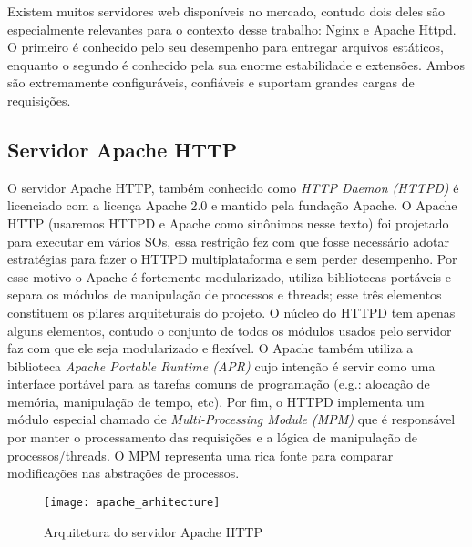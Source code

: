 Existem muitos servidores web disponíveis no mercado, contudo dois deles são
especialmente relevantes para o contexto desse trabalho: Nginx e Apache Httpd.
O primeiro é conhecido pelo seu desempenho para entregar arquivos estáticos,
enquanto o segundo é conhecido pela sua enorme estabilidade e extensões. Ambos
são extremamente configuráveis, confiáveis e suportam grandes cargas de
requisições.

\subsection{Servidor Apache HTTP}
\label{sec:architecture}

O servidor Apache HTTP, também conhecido como \textit{HTTP Daemon (HTTPD)} é
licenciado com a licença Apache 2.0 e mantido pela fundação Apache.  O Apache
HTTP (usaremos HTTPD e Apache como sinônimos nesse texto) foi projetado para
executar em vários SOs, essa restrição fez com que fosse necessário adotar
estratégias para fazer o HTTPD multiplataforma e sem perder desempenho. Por
esse motivo o Apache é fortemente modularizado, utiliza bibliotecas portáveis e
separa os módulos de manipulação de processos e threads; esse três elementos
constituem os pilares arquiteturais do projeto. O núcleo do HTTPD tem apenas
alguns elementos, contudo o conjunto de todos os módulos usados pelo servidor
faz com que ele seja modularizado e flexível. O Apache também utiliza a
biblioteca \textit{Apache Portable Runtime (APR)} cujo intenção é servir como
uma interface portável para as tarefas comuns de programação (e.g.: alocação de
memória, manipulação de tempo, etc). Por fim, o HTTPD implementa um módulo
especial chamado de \textit{Multi-Processing Module (MPM)} que é responsável
por manter o processamento das requisições e a lógica de manipulação de
processos/threads. O MPM representa uma rica fonte para comparar modificações
nas abstrações de processos.

\begin{figure}[!h]
  \centering
  \texttt{[image: apache\_arhitecture]} 
  \caption{Arquitetura do servidor Apache HTTP \citep{apache_module_book}}
  \label{fig:apache_architecture} 
\end{figure}

